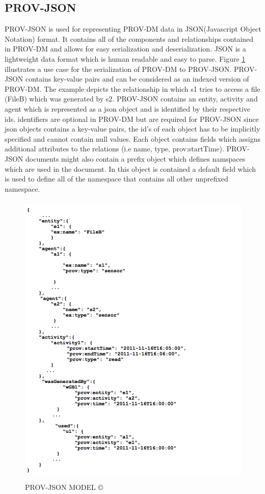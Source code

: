 \subsection{PROV-JSON}

PROV-JSON is used for representing PROV-DM data in JSON(Javascript Object Notation) format. It contains all of the components and relationships contained in PROV-DM and allows for easy serialization and deserialization. JSON is a lightweight data format which is human readable and easy to parse. Figure \ref{provjson} illustrates a use case for the serialization of PROV-DM to PROV-JSON. PROV-JSON contains key-value pairs and can be considered as an indexed version of PROV-DM. The example depicts the relationship in which s1 tries to access a file (FileB) which was generated by s2. PROV-JSON  contains an entity, activity and agent which is represented as a json object and is identified by their respective ids.  identifiers are optional in PROV-DM but are required for PROV-JSON since json objects contains a key-value pairs, the id's of each object has to be implicitly specified and cannot contain null values. Each object contains fields which assigns additional attributes to the relations (i.e name, type, prov:startTime).  PROV-JSON documents might also contain a prefix object which defines namspaces which are used in the document. In this object is contained a default field which is used to define all of the namespace that contains all other unprefixed namespace.


\begin{figure}[h]
\begin{center}

\includegraphics[height=5.7in]{prov_json_edit.png}
\end{center}
\caption{PROV-JSON MODEL \copyright \cite{prov_json}}

\label{provjson}

\end{figure}


